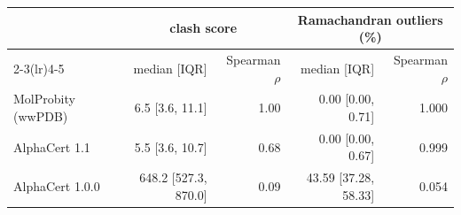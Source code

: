 \begin{tabular}{lrrrr}
\toprule
 & \multicolumn{2}{c}{clash score} & \multicolumn{2}{c}{Ramachandran outliers (\%)} \\
\cmidrule(lr){2-3}\cmidrule(lr){4-5}
 & median [IQR] & Spearman $\rho$ & median [IQR] & Spearman $\rho$ \\
\midrule
MolProbity (wwPDB) & 6.5 [3.6, 11.1] & 1.00 & 0.00 [0.00, 0.71] & 1.000 \\
AlphaCert 1.1 & 5.5 [3.6, 10.7] & 0.68 & 0.00 [0.00, 0.67] & 0.999 \\
AlphaCert 1.0.0 & 648.2 [527.3, 870.0] & 0.09 & 43.59 [37.28, 58.33] & 0.054 \\
\bottomrule
\end{tabular}
